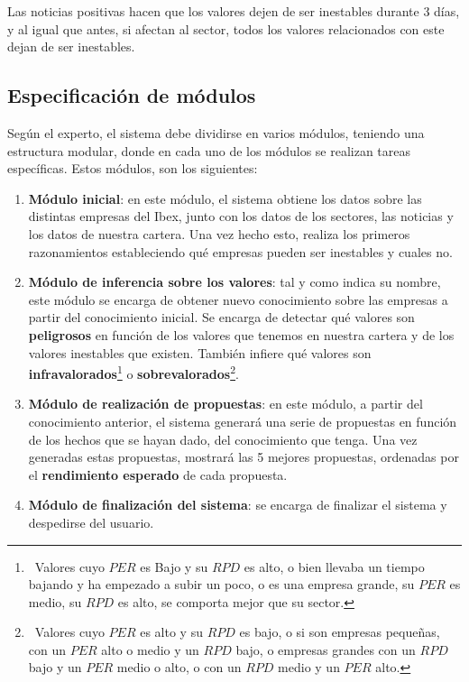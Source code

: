 \documentclass[10pt,spanish]{article}
\theoremstyle{plain}
\theoremstyle{definition}
\begin{document}
Las noticias positivas hacen que los valores dejen de ser inestables durante 3 días, y al igual que antes, si afectan al sector, todos los valores relacionados con este dejan de ser inestables.

\subsection{Especificación de módulos}

Según el experto, el sistema debe dividirse en varios módulos, teniendo una estructura modular, donde en cada uno de los módulos se realizan tareas específicas. Estos módulos, son los siguientes:

\begin{enumerate}[---]
    \item \textbf{Módulo inicial}: en este módulo, el sistema obtiene los datos sobre las distintas empresas del Ibex, junto con los datos de los sectores, las noticias y los datos de nuestra cartera. Una vez hecho esto, realiza los primeros razonamientos estableciendo qué empresas pueden ser inestables y cuales no.

    \item \textbf{Módulo de inferencia sobre los valores}: tal y como indica su nombre, este módulo se encarga de obtener nuevo conocimiento sobre las empresas a partir del conocimiento inicial. Se encarga de detectar qué valores son \textbf{peligrosos} en función de los valores que tenemos en nuestra cartera y de los valores inestables que existen. También infiere qué valores son \textbf{infravalorados}\footnote{~Valores cuyo $PER$ es Bajo y su $RPD$ es alto, o bien llevaba un tiempo bajando y ha empezado a subir un poco, o es una empresa grande, su $PER$ es medio, su $RPD$ es alto, se comporta mejor que su sector.} o \textbf{sobrevalorados}\footnote{~Valores cuyo $PER$ es alto y su $RPD$ es bajo, o si son empresas pequeñas, con un $PER$ alto o medio y un $RPD$ bajo, o empresas grandes con un $RPD$ bajo y un $PER$ medio o alto, o con un $RPD$ medio y un $PER$ alto.}.
    \item \textbf{Módulo de realización de propuestas}: en este módulo, a partir del conocimiento anterior, el sistema generará una serie de propuestas en función de los hechos que se hayan dado, del conocimiento que tenga. Una vez generadas estas propuestas, mostrará las 5 mejores propuestas, ordenadas por el \textbf{rendimiento esperado} de cada propuesta.

    \item \textbf{Módulo de finalización del sistema}: se encarga de finalizar el sistema y despedirse del usuario.
\end{enumerate}
\end{document}
